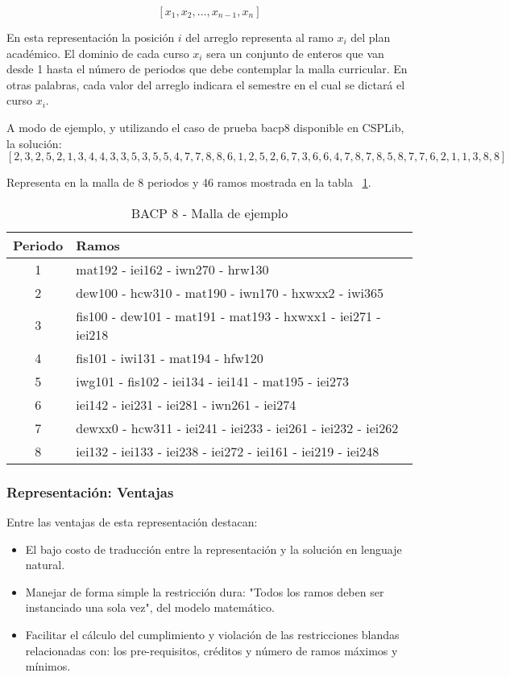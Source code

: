 \documentclass[letter, 10pt]{article}
\begin{document}
$$
	[x_{1},x_{2}, \dots ,x_{n-1},x_{n}]
$$

En esta representación la posición $i$ del arreglo representa al ramo $x_{i}$
del plan académico. El dominio de cada curso $x_{i}$ sera un conjunto de enteros
que van desde 1 hasta el número de periodos que debe contemplar la malla
curricular. En otras palabras, cada valor del arreglo indicara el semestre en el
cual se dictará el curso $x_{i}$.

A modo de ejemplo, y utilizando el caso de prueba bacp8 disponible en CSPLib, la solución:
$$
[2,3,2,5,2,1,3,4,4,3,3,5,3,5,5,4,7,7,8,8,6,1,2,5,2,6,7,3,6,6,4,7,8,7,8,5,8,7,7,6,2,1,1,3,8,8]
$$


Representa en la malla de 8 periodos y 46 ramos mostrada en la tabla ~\ref{table:ejemplo}.

\begin{table}[h]
\centering
\label{table:ejemplo}
\caption{BACP 8 - Malla de ejemplo}
\begin{tabular}{|c|l|}
\hline 
Periodo & Ramos\tabularnewline
\hline 
\hline 
1 & mat192 - iei162 - iwn270 - hrw130\tabularnewline
\hline 
2 & dew100 - hcw310 - mat190 - iwn170 - hxwxx2 - iwi365\tabularnewline
\hline 
3 & fis100 - dew101 - mat191 - mat193 - hxwxx1 - iei271 - iei218\tabularnewline
\hline 
4 & fis101 - iwi131 - mat194 - hfw120\tabularnewline
\hline 
5 & iwg101 - fis102 - iei134 - iei141 - mat195 - iei273\tabularnewline
\hline 
6 & iei142 - iei231 - iei281 - iwn261 - iei274\tabularnewline
\hline 
7 & dewxx0 - hcw311 - iei241 - iei233 - iei261 - iei232 - iei262\tabularnewline
\hline 
8 & iei132 - iei133 - iei238 - iei272 - iei161 - iei219 - iei248\tabularnewline
\hline 
\end{tabular}

\end{table}


\subsubsection{Representación: Ventajas}
Entre las ventajas de esta representación destacan:
\begin{itemize}
\item El bajo costo de traducción entre la representación y la solución
  en lenguaje natural.
\item Manejar de forma simple la restricción dura: "Todos los ramos
  deben ser instanciado una sola vez", del modelo matemático.
\item Facilitar el cálculo del cumplimiento y violación de las
  restricciones blandas relacionadas con: los pre-requisitos, créditos y
  número de ramos máximos y mínimos.
\end{itemize}
\end{document}
